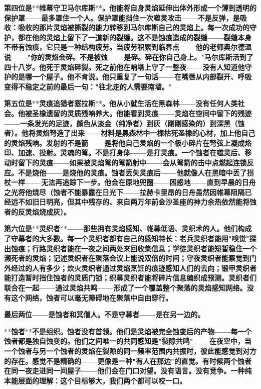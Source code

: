 \documentclass[12pt,a4paper,openany]{ctexbook}
\begin{document}
\textbf{第四位是}**\textbf{帷幕守卫马尔库斯}**\textbf{。他能将自身灵焰延伸出体外形成一个薄到透明的保护罩——最多罩住一个人。保护罩能挡住一次噬灵攻击——不是反弹，是吸收：吸收的那片灵焰被撕裂的能力转移到马尔库斯自己的灵焰上。每一次成功的守护，都在他的灵焰上留下了一道新的裂缝。这不是蚀痕造成的裂缝——裂缝本身不带有蚀痕，它只是一种结构疲劳。当疲劳积累到临界点——他的老师奥尔德温说——"你的灵焰会碎。不是被蚀——是碎。碎在你自己身上。"马尔库斯活到了四十八岁。他死于灵焰碎裂。死之前他在哨塔上守了一整夜——没有人知道他守护的是哪一个屋子。他不肯说。他只重复了一句话——在嘴唇从内部裂开、呼吸变得不稳定之前的最后一句："往北走的人需要南墙。"}


\textbf{第五位是}**\textbf{灵痕追猎者塞拉斯}**\textbf{。他从小就生活在黑森林——没有任何人类社会。他被圣橡遗留的灵质残响养大。他能看到灵痕——灵焰在空间中留下的残迹——一条发光的足迹，颜色从淡金（纯净者）到灰（刚刚感染的）到深黑（蚀者）。他将灵焰弩造了出来——材料是黑森林中一棵枯死圣橡的心材，加上他自己的灵焰残响。发射的不是箭——是将他自己灵焰的一个极小碎片在弩弦上凝成烙印、加速、投射。灵魂的弩。不是打身体——是打灵痕。一个蚀者在噬灵后、移动时留下的灵痕——如果被灵焰弩的弩箭射中——会从弩箭的击中点燃起连锁反应。不是烧他——是烧他的灵痕。蚀者丢失灵痕后——他就像人在黑暗中丢了拐杖一样——无法再追踪下一步。他会在原地兜圈——困惑地——直到早晨的日舟之光将他烧尽（蚀者不能暴露在日光下——拉赫卡里昂的日舟虽然因帷幕阻隔已经远不如旧日明亮，但其中残存的、来自两万年前金沙圣座的神力余热依然能将蚀者的反灵焰烧成灰）。}


\textbf{第六位是}**\textbf{灵织者}**\textbf{——那些拥有灵焰感知、帷幕低语、灵织术的人。他们构成了守幕者的大多数。每一个灵织者都有自己的感知特长：老兵灵织者能用"嗅觉"探出蚀痕；行路灵织者能在一夜之间两处来回收集信息；学徒灵织者能短暂稳住一个濒死者的灵焰；记述灵织者在聚落会议上能说双倍的时间；守夜灵织者能察觉到门外经过的人有多少；炊火灵织者通过灵焰烹饪的痕迹感知人们的去向；锻甲灵织者能打造暂时挡住蚀者的灵质门锁；织幕灵织者能将碎片信息编织成预测。灵织者们联合在一起——通过灵焰共鸣——形成了一个覆盖整个聚落的灵焰感知网络。没有这个网络，蚀者可以毫无障碍地在聚落中自由穿行。}


\textbf{最后两位——是蚀者和冥僧人。不是守幕者——是在另一边的。}


**\textbf{蚀者}**\textbf{不是组织。蚀者没有首领。他们是灵焰被完全蚀变后的产物——每一个蚀者都是独自蚀变的。他们之间唯一的共同感知是"裂隙共鸣"——在夜空中，当一个蚀者与另一个蚀者的灵焰在裂隙的同一频率范围内共振时，彼此能感觉到对方的存在。感觉不是精确的——更像是一种"有人在那边"的直觉。有时候两个蚀者在同一夜走进同一间屋子——他们会在门口对望。没有语言。没有竞争。一种纯本能层面的理解：这个目标够大，我们两个都可以咬一口。}
\end{document}
